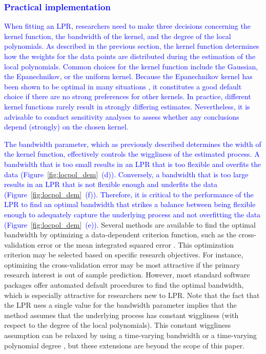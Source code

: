 \documentclass[man, floatsintext]{apa7}
\begin{document}
\subsubsection{\textcolor{blue}{Practical implementation}}

\textcolor{blue}{
  When fitting an LPR, researchers need to make three decisions concerning the
  kernel function, the bandwidth of the kernel, and the degree of the local
  polynomials. As described in the previous section, the kernel function
  determines how the weights for the data points are distributed during
  the estimation of the local polynomials. Common choices for the kernel
  function include the
  Gaussian, the Epanechnikov, or the uniform kernel. Because the
  Epanechnikov kernel has been shown to be optimal in many situations
  \parencite{fan_local_1997}, it constitutes a good default choice if there are
  no strong preferences for other kernels. In practice, different kernel
  functions rarely result in strongly differing estimates. Nevertheless, it is
  advisable to conduct sensitivity analyses to assess whether any conclusions
  depend (strongly) on the chosen kernel.
}

\textcolor{blue}{
  The bandwidth parameter, which as previously described determines the width
  of the kernel function,
  effectively controls the wiggliness of the
  estimated process. A bandwidth that is too small results in an LPR that is
  too flexible and overfits the data (Figure~\ref{fig:locpol_dem}~(d)).
  Conversely, a bandwidth that is too large results in an LPR that is not
  flexible enough and underfits the data (Figure~\ref{fig:locpol_dem}~(f)).
  Therefore, it is critical to the performance of the LPR to find an optimal
  bandwidth that strikes a balance between being flexible enough to adequately
  capture the underlying process and not overfitting the data
  (Figure~\ref{fig:locpol_dem}~(e)).} Several methods are available to find
the
optimal bandwidth by optimizing a data-dependent criterion function, such as
the cross-validation error or the mean integrated squared error
\parencite{kohler_review_2014, debruyne_model_2008}. This optimization
criterion may be selected based on specific research objectives. For instance,
optimizing the cross-validation error may be most attractive if the primary
research interest is out of sample prediction. However, most standard software
packages offer automated default procedures to find the optimal bandwidth,
which is especially attractive for researchers new to LPR\@. Note that the fact
that the LPR uses a single value for the bandwidth parameter implies that the
method assumes that the underlying process has constant wiggliness (with
respect to the degree of the local polynomials). This
constant wiggliness assumption can be relaxed by using a time-varying bandwidth
\parencite{fan_data-driven_1995} or a time-varying polynomial degree
\parencite{fan_adaptive_1995}, but these extensions are beyond the scope of
this paper.
\end{document}
